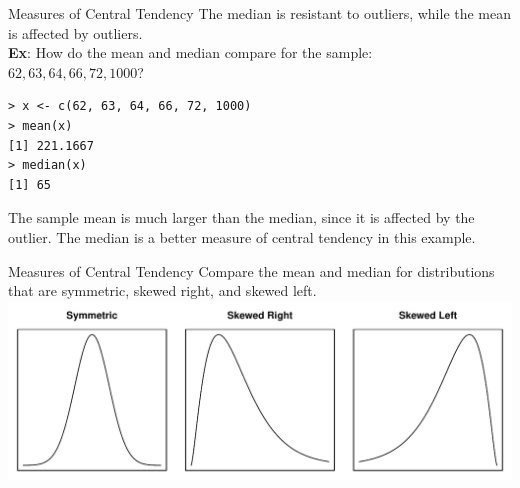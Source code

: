 \documentclass{beamer}
\begin{document}
\begin{frame}[fragile]{Measures of Central Tendency}
The median is resistant to outliers, while the mean is affected by outliers.\\
\vspace{10pt}
\textbf{Ex}: How do the mean and median compare for the sample:\\ $62, 63, 64, 66, 72, 1000$?\\
\begin{verbatim}
> x <- c(62, 63, 64, 66, 72, 1000)
> mean(x)
[1] 221.1667
> median(x)
[1] 65
\end{verbatim}
{\color{blue}
The sample mean is much larger than the median, since it is affected by the outlier.  The median is a better measure of central tendency in this example.
}
\end{frame}

\begin{frame}{Measures of Central Tendency}
Compare the mean and median for distributions that are symmetric, skewed right, and skewed left.\\
\vspace{20pt}
\centering
\includegraphics[scale=0.6]{distributions.pdf}
\end{frame}
\end{document}
